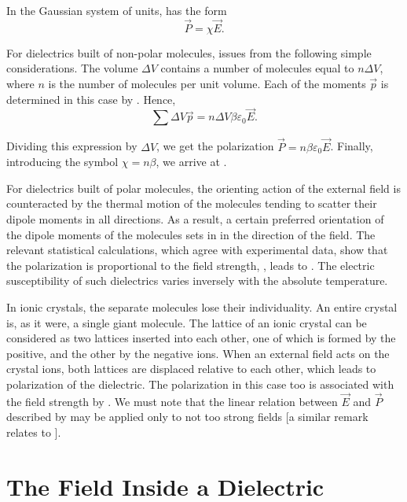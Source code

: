 In the Gaussian system of units,  has the form
\begin{equation}\label{eq:2_6}
    \vec{P} = \chi \vec{E}.
\end{equation}

For dielectrics built of non-polar molecules,  issues from the following simple considerations. The volume $\Delta{V}$ contains a number of molecules equal to $n\Delta{V}$, where $n$ is the number of molecules per unit volume. Each of the moments $\vec{p}$ is determined in this case by . Hence,
\begin{equation*}
    \sum{\Delta{V}} \vec{p} = n \Delta{V} \beta \varepsilon_0 \vec{E}.
\end{equation*}

\noindent
Dividing this expression by $\Delta{V}$, we get the polarization $\vec{P}=n\beta\varepsilon_0\vec{E}$. Finally, introducing the symbol $\chi=n\beta$, we arrive at .

For dielectrics built of polar molecules, the orienting action of the external field is counteracted by the thermal motion of the molecules tending to scatter their dipole moments in all directions. As a result, a certain preferred orientation of the dipole moments of the molecules sets in in the direction of the field. The relevant statistical calculations, which agree with experimental data, show that the polarization is proportional to the field strength, \ie, leads to . The electric susceptibility of such dielectrics varies inversely with the absolute temperature.

In ionic crystals, the separate molecules lose their individuality. An entire crystal is, as it were, a single giant molecule. The lattice of an ionic crystal can be considered as two lattices inserted into each other, one of which is formed by the positive, and the other by the negative ions. When an external field acts on the crystal ions, both lattices are displaced relative to each other, which leads to polarization of the dielectric. The polarization in this case too is associated with the field strength by . We must note that the linear relation between $\vec{E}$ and $\vec{P}$ described by  may be applied only to not too strong fields [a similar remark relates to ].

\section{The Field Inside a Dielectric}\label{sec:2_3}

